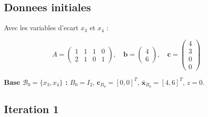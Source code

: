\documentclass[12pt,a4paper]{article}
\begin{document}
\subsection{Donnees initiales}

\begin{correction}
Avec les variables d'ecart $x_3$ et $x_4$ :

$$A = \begin{pmatrix}1 & 1 & 1 & 0\\2 & 1 & 0 & 1\end{pmatrix}, \quad \mathbf{b} = \begin{pmatrix}4\\6\end{pmatrix}, \quad \mathbf{c} = \begin{pmatrix}4\\3\\0\\0\end{pmatrix}$$

\textbf{Base $\mathcal{B}_0 = \{x_3, x_4\}$ :} $B_0 = I_2$, $\mathbf{c}_{B_0} = [0,0]^T$, $\bar{\mathbf{x}}_{B_0} = [4,6]^T$, $z = 0$.
\end{correction}

\subsection{Iteration 1}
\end{document}
